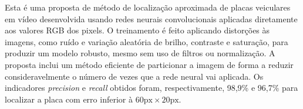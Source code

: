 
Esta é uma proposta de método de localização aproximada de placas veiculares
em vídeo desenvolvida usando redes neurais convolucionais aplicadas diretamente
aos valores RGB dos pixels. O treinamento é feito aplicando distorções às
imagens, como
ruído e variação aleatória de brilho, contraste e saturação, para produzir um
modelo robusto, mesmo sem uso de filtros ou normalização. A proposta inclui um
método eficiente de particionar a imagem de forma a reduzir consideravelmente o
número de vezes que a rede neural vai aplicada. Os indicadores \emph{precision}
e \emph{recall} obtidos foram, respectivamente, 98,9\% e 96,7\% para localizar
a placa com erro inferior à $60\text{px} \times 20\text{px}$.
